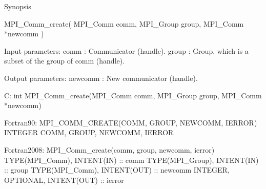 Synopsis

MPI_Comm_create( MPI_Comm comm, MPI_Group group, MPI_Comm *newcomm )

Input parameters:
comm : Communicator (handle).
group : Group, which is a subset of the group of comm (handle).

Output parameters:
newcomm : New communicator (handle).

C:
int MPI_Comm_create(MPI_Comm comm, MPI_Group group, MPI_Comm *newcomm)

Fortran90:
MPI_COMM_CREATE(COMM, GROUP, NEWCOMM, IERROR)
INTEGER    COMM, GROUP, NEWCOMM, IERROR

Fortran2008:
MPI_Comm_create(comm, group, newcomm, ierror)
TYPE(MPI_Comm), INTENT(IN) :: comm
TYPE(MPI_Group), INTENT(IN) :: group
TYPE(MPI_Comm), INTENT(OUT) :: newcomm
INTEGER, OPTIONAL, INTENT(OUT) :: ierror
